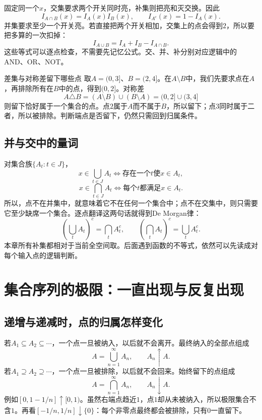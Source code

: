 固定同一个$x$，交集要求两个开关同时亮，补集则把亮和灭交换。因此
\[
 I_{A\cap B}(x)=I_A(x)I_B(x),\qquad
 I_{A^c}(x)=1-I_A(x).
\]
并集要求至少一个开关亮。若直接把两个开关相加，交集上的点会得到$2$，所以要把多算的一次扣掉：
\[
 I_{A\cup B}=I_A+I_B-I_{A\cap B}.
\]
这些等式可以逐点检查，不需要先记忆公式。交、并、补分别对应逻辑中的AND、OR、NOT。

\begin{bookexample}{差集与对称差留下哪些点}
取$A=(0,3]$、$B=(2,4]$。在$A\setminus B$中，我们先要求点在$A$，再排除所有在$B$中的点，得到$(0,2]$。对称差
\[
 A\triangle B=(A\setminus B)\cup(B\setminus A)
             =(0,2]\cup(3,4]
\]
则留下恰好属于一个集合的点。点$2$属于$A$而不属于$B$，所以留下；点$3$同时属于二者，所以被排除。判断端点是否留下，仍然只需回到归属条件。
\end{bookexample}

\subsection{并与交中的量词}

对集合族$\{A_t:t\in J\}$，
\[
 x\in\bigcup_{t\in J}A_t
 \iff\text{存在一个$t$使$x\in A_t$},
\]
\[
 x\in\bigcap_{t\in J}A_t
 \iff\text{每个$t$都满足$x\in A_t$}.
\]
所以，点不在并集中，就意味着它不在任何一个集合中；点不在交集中，则只需要它至少缺席一个集合。逐点翻译这两句话就得到De Morgan律：
\[
 \left(\bigcup_t A_t\right)^c=\bigcap_t A_t^c,
 \qquad
 \left(\bigcap_t A_t\right)^c=\bigcup_t A_t^c.
\]
本章所有补集都相对于当前全空间取。后面遇到函数的不等式，依然可以先读成对每个输入点的逻辑判断。

\section{集合序列的极限：一直出现与反复出现}

\subsection{递增与递减时，点的归属怎样变化}

若$A_1\subseteq A_2\subseteq\cdots$，一个点一旦被纳入，以后就不会离开。最终纳入的全部点组成
\[
 A=\bigcup_{n=1}^{\infty}A_n,\qquad A_n\uparrow A.
\]
若$A_1\supseteq A_2\supseteq\cdots$，一个点一旦被排除，以后就不会回来。始终留下的点组成
\[
 A=\bigcap_{n=1}^{\infty}A_n,\qquad A_n\downarrow A.
\]
例如$[0,1-1/n]\uparrow[0,1)$。虽然右端点趋近$1$，点$1$却从未被纳入，所以极限集合不含$1$。再看$[-1/n,1/n]\downarrow\{0\}$：每个非零点最终都会被排除，只有$0$一直留下。

